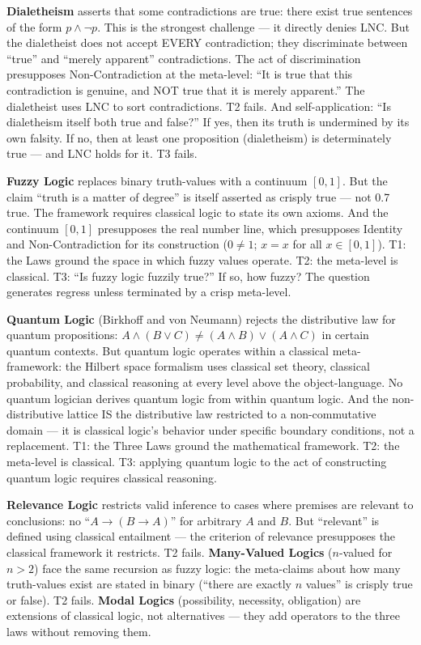 \documentclass[10pt, openany, oneside]{book}
\begin{document}
\textbf{Dialetheism} asserts that some contradictions are true: there exist true sentences of the form $p \wedge \neg p$. This is the strongest challenge --- it directly denies LNC. But the dialetheist does not accept EVERY contradiction; they discriminate between ``true'' and ``merely apparent'' contradictions. The act of discrimination presupposes Non-Contradiction at the meta-level: ``It is true that this contradiction is genuine, and NOT true that it is merely apparent.'' The dialetheist uses LNC to sort contradictions. T2 fails. And self-application: ``Is dialetheism itself both true and false?'' If yes, then its truth is undermined by its own falsity. If no, then at least one proposition (dialetheism) is determinately true --- and LNC holds for it. T3 fails.

\textbf{Fuzzy Logic} replaces binary truth-values with a continuum $[0, 1]$. But the claim ``truth is a matter of degree'' is itself asserted as crisply true --- not 0.7 true. The framework requires classical logic to state its own axioms. And the continuum $[0, 1]$ presupposes the real number line, which presupposes Identity and Non-Contradiction for its construction ($0 \neq 1$; $x = x$ for all $x \in [0,1]$). T1: the Laws ground the space in which fuzzy values operate. T2: the meta-level is classical. T3: ``Is fuzzy logic fuzzily true?'' If so, how fuzzy? The question generates regress unless terminated by a crisp meta-level.

\textbf{Quantum Logic} (Birkhoff and von Neumann) rejects the distributive law for quantum propositions: $A \wedge (B \vee C) \neq (A \wedge B) \vee (A \wedge C)$ in certain quantum contexts. But quantum logic operates within a classical meta-framework: the Hilbert space formalism uses classical set theory, classical probability, and classical reasoning at every level above the object-language. No quantum logician derives quantum logic from within quantum logic. And the non-distributive lattice IS the distributive law restricted to a non-commutative domain --- it is classical logic's behavior under specific boundary conditions, not a replacement. T1: the Three Laws ground the mathematical framework. T2: the meta-level is classical. T3: applying quantum logic to the act of constructing quantum logic requires classical reasoning.

\textbf{Relevance Logic} restricts valid inference to cases where premises are relevant to conclusions: no ``$A \to (B \to A)$'' for arbitrary $A$ and $B$. But ``relevant'' is defined using classical entailment --- the criterion of relevance presupposes the classical framework it restricts. T2 fails. \textbf{Many-Valued Logics} ($n$-valued for $n > 2$) face the same recursion as fuzzy logic: the meta-claims about how many truth-values exist are stated in binary (``there are exactly $n$ values'' is crisply true or false). T2 fails. \textbf{Modal Logics} (possibility, necessity, obligation) are extensions of classical logic, not alternatives --- they add operators to the three laws without removing them.
\end{document}
